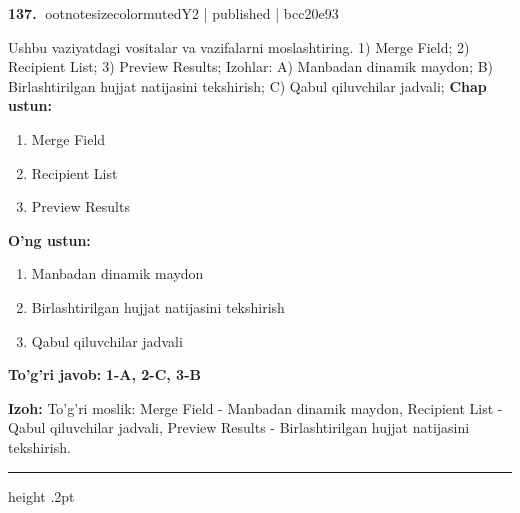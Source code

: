 \documentclass[10pt,a4paper]{article}
\begin{document}
\textbf{\color{ink}137.} {ootnotesizecolor{muted}Y2 | published | bcc20e93}
\par
Ushbu vaziyatdagi vositalar va vazifalarni moslashtiring.  1) Merge Field;  2) Recipient List;  3) Preview Results;  Izohlar: A) Manbadan dinamik maydon;  B) Birlashtirilgan hujjat natijasini tekshirish;  C) Qabul qiluvchilar jadvali;
\textbf{Chap ustun:}\begin{enumerate}[label=\arabic*),leftmargin=9mm]
\item Merge Field
\item Recipient List
\item Preview Results
\end{enumerate}
\textbf{O'ng ustun:}\begin{enumerate}[label=\Alph*),leftmargin=9mm]
\item Manbadan dinamik maydon
\item Birlashtirilgan hujjat natijasini tekshirish
\item Qabul qiluvchilar jadvali
\end{enumerate}
\begin{tcolorbox}[enhanced,breakable,colback=teal!4,colframe=teal!55!black,boxrule=0.45pt,arc=1.2mm,left=2.8mm,right=2.8mm,top=2mm,bottom=2mm]
\textbf{\color{teal}To'g'ri javob:} \textbf{1-A, 2-C, 3-B}
\par\smallskip
\textbf{Izoh:} To'g'ri moslik: Merge Field - Manbadan dinamik maydon, Recipient List - Qabul qiluvchilar jadvali, Preview Results - Birlashtirilgan hujjat natijasini tekshirish.
\end{tcolorbox}
\vspace{2mm}\hrule height .2pt\vspace{2mm}
\end{document}
